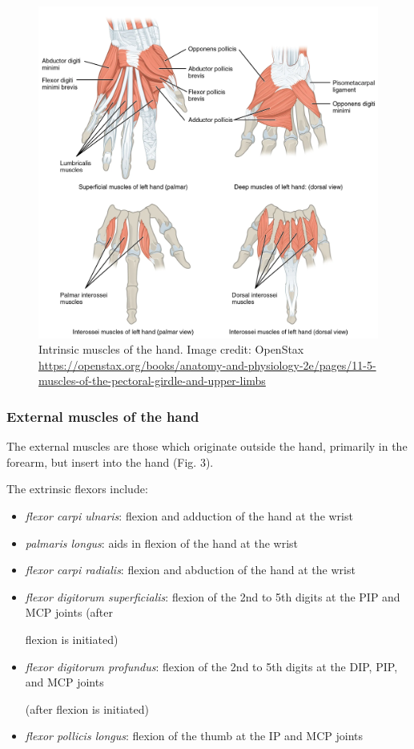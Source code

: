 \documentclass{article}
\begin{document}
\begin{figure}[!htbp]
\centering
\includegraphics[width=0.7\linewidth]{files/EPpXta8zJdzN048lz8AR-d87e80f99dcfe8a7d01e23b64ddf702a.png}
\caption[]{Intrinsic muscles of the hand. Image credit: OpenStax \href{https://openstax.org/books/anatomy-and-physiology-2e/pages/11-5-muscles-of-the-pectoral-girdle-and-upper-limbs}{https://openstax.org/books/anatomy-and-physiology-2e/pages/11-5-muscles-of-the-pectoral-girdle-and-upper-limbs}}
\label{s5tQEqPmlm}
\end{figure}

\subsubsection{External muscles of the hand}

The external muscles are those which originate outside the hand, primarily in the forearm, but insert into the hand \citep{tortora2018principles, ombregt2013applied, openStax_upper} (Fig. 3).

The extrinsic flexors include:

\begin{itemize}
\item \textit{flexor carpi ulnaris}: flexion and adduction of the hand at the wrist


\item \textit{palmaris longus}: aids in flexion of the hand at the wrist


\item \textit{flexor carpi radialis}: flexion and abduction of the hand at the wrist


\item \textit{flexor digitorum superficialis}: flexion of the 2nd to 5th digits at the PIP and MCP joints (after

flexion is initiated)


\item \textit{flexor digitorum profundus}: flexion of the 2nd to 5th digits at the DIP, PIP, and MCP joints

(after flexion is initiated)


\item \textit{flexor pollicis longus}: flexion of the thumb at the IP and MCP joints
\end{itemize}
\end{document}
